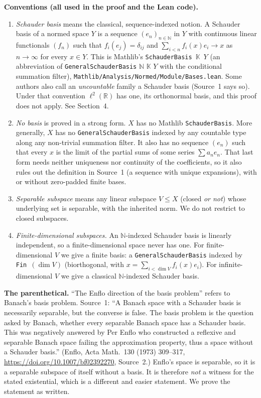\documentclass[11pt]{article}
\theoremstyle{definition}
\newcommand{\K}{\mathbb{K}}
\begin{document}
\textbf{Conventions (all used in the proof and the Lean code).}
\begin{enumerate}
\item \emph{Schauder basis} means the classical, sequence-indexed notion. A Schauder basis of a
normed space $Y$ is a sequence $(e_n)_{n\in\mathbb{N}}$ in $Y$ with continuous linear functionals
$(f_n)$ such that $f_i(e_j)=\delta_{ij}$ and $\sum_{i<n} f_i(x)e_i\to x$ as $n\to\infty$ for every
$x\in Y$. This is Mathlib's \texttt{SchauderBasis}~$\K$~$Y$ (an abbreviation of
\texttt{GeneralSchauderBasis} $\mathbb{N}$ $\K$ $Y$ with the conditional summation filter),
\nolinkurl{Mathlib/Analysis/Normed/Module/Bases.lean}. Some authors also call an \emph{uncountable}
family a Schauder basis (Source~1 says so). Under that convention $\ell^2(\mathbb{R})$ has one, its
orthonormal basis, and this proof does not apply. See Section~4.
\item \emph{No basis} is proved in a strong form. $X$ has no Mathlib \texttt{SchauderBasis}. More
generally, $X$ has no \texttt{GeneralSchauderBasis} indexed by any countable type along any
non-trivial summation filter. It also has no sequence $(e_n)$ such that every $x$ is the limit of
the partial sums of some series $\sum a_n e_n$. That last form needs neither uniqueness nor
continuity of the coefficients, so it also rules out the definition in Source~1 (a sequence with
unique expansions), with or without zero-padded finite bases.
\item \emph{Separable subspace} means any linear subspace $V\le X$ (closed \emph{or not}) whose
underlying set is separable, with the inherited norm. We do not restrict to closed subspaces.
\item \emph{Finite-dimensional subspaces.} An $\mathbb{N}$-indexed Schauder basis is linearly
independent, so a finite-dimensional space never has one. For finite-dimensional $V$ we give a
finite basis: a \texttt{GeneralSchauderBasis} indexed by \texttt{Fin}~$(\dim V)$ (biorthogonal,
with $x=\sum_{i<\dim V} f_i(x)e_i$). For infinite-dimensional $V$ we give a classical
$\mathbb{N}$-indexed Schauder basis.
\end{enumerate}

\textbf{The parenthetical.} ``The Enflo direction of the basis problem'' refers to Banach's basis
problem. Source~1: ``A Banach space with a Schauder basis is necessarily separable, but the converse
is false. The basis problem is the question asked by Banach, whether every separable Banach space has
a Schauder basis. This was negatively answered by Per Enflo who constructed a reflexive and
separable Banach space failing the approximation property, thus a space without a Schauder
basis.'' (Enflo, Acta Math.\ 130 (1973) 309--317, \url{https://doi.org/10.1007/bf02392270},
Source~2.) Enflo's space is separable, so it is
a separable subspace of itself without a basis. It is therefore \emph{not} a witness for the
stated existential, which is a different and easier statement. We prove the statement as written.
\end{document}
